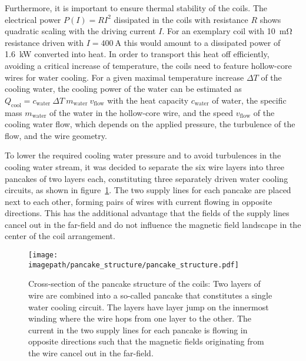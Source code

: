 Furthermore, it is important to ensure thermal stability of the coils. The electrical power $P(I) = RI^2$ dissipated in the coils with resistance $R$ shows quadratic scaling  with the driving current $I$. For an exemplary coil with \SI{10}{\milli\ohm} resistance driven with $I = \SI{400}{\ampere}$ this would amount to a dissipated power of \SI{1.6}{\kilo\watt} converted into heat. In order to transport this heat off efficiently, avoiding a critical increase of temperature, the coils need to feature hollow-core wires for water cooling. For a given maximal temperature increase $\Delta T$ of the cooling water, the cooling power of the water can be estimated as $Q_\text{cool} = c_\text{water} ~ \Delta T ~ m_\text{water} ~ v_\text{flow}$ with the heat capacity $ c_\text{water}$ of water, the specific mass $m_\text{water}$ of the water in the hollow-core wire, and the speed $v_\text{flow}$ of the cooling water flow, which depends on the applied pressure, the turbulence of the flow, and the wire geometry.

To lower the required cooling water pressure and to avoid turbulences in the cooling water stream, it was decided to separate the six wire layers into three pancakes of two layers each, constituting three separately driven water cooling circuits, as shown in figure~\ref{fig:pancake_structure}. The two supply lines for each pancake are placed next to each other, forming pairs of wires with current flowing in opposite directions. This has the additional advantage that the fields of the supply lines cancel out in the far-field and do not influence the magnetic field landscape in the center of the coil arrangement.

\begin{figure}
    \centering
    \texttt{[image: \\imagepath/pancake\_structure/pancake\_structure.pdf]}
    \caption{Cross-section of the pancake structure of the coils: Two layers of wire are combined into a so-called pancake that constitutes a single water cooling circuit. The layers have layer jump on the innermost winding where the wire hops from one layer to the other. The current in the two supply lines for each pancake is flowing in opposite directions such that the magnetic fields originating from the wire cancel out in the far-field.}
    \label{fig:pancake_structure}
\end{figure}

